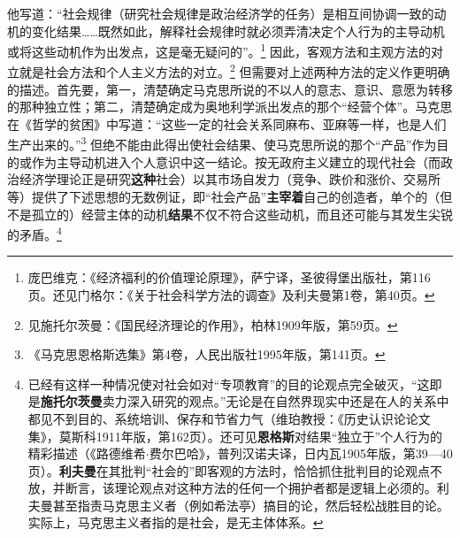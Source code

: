 \documentclass[fontset=fandol, a4paper, 12pt, openright]{ctexbook}
\begin{document}
他写道：“社会规律（研究社会规律是政治经济学的任务）是相互间协调一致的动机的变化结果……既然如此，解释社会规律时就必须弄清决定个人行为的主导动机或将这些动机作为出发点，这是毫无疑问的”。\footnote{庞巴维克：《经济福利的价值理论原理》，萨宁译，圣彼得堡出版社，第116页。还见门格尔：《关于社会科学方法的调查》及利夫曼第1卷，第40页。} 因此，客观方法和主观方法的对立就是社会方法和个人主义方法的对立。\footnote{见施托尔茨曼：《国民经济理论的作用》，柏林1909年版，第59页。} 但需要对上述两种方法的定义作更明确的描述。首先要，第一，清楚确定马克思所说的不以人的意志、意识、意愿为转移的那种独立性；第二，清楚确定成为奥地利学派出发点的那个“经营个体”。马克思在《哲学的贫困》中写道：“这些一定的社会关系同麻布、亚麻等一样，也是人们生产出来的。”\footnote{《马克思恩格斯选集》第4卷，人民出版社1995年版，第141页。} 但绝不能由此得出使社会结果、使马克思所说的那个“产品”作为目的或作为主导动机进入个人意识中这一结论。按无政府主义建立的现代社会（而政治经济学理论正是研究\textbf{这种}社会）以其市场自发力（竞争、跌价和涨价、交易所等）提供了下述思想的无数例证，即“社会产品”\textbf{主宰着}自己的创造者，单个的（但不是孤立的）经营主体的动机\textbf{结果}不仅不符合这些动机，而且还可能与其发生尖锐的矛盾。\footnote{已经有这样一种情况使对社会如对“专项教育”的目的论观点完全破灭，“这即是\textbf{施托尔茨曼}卖力深入研究的观点。”无论是在自然界现实中还是在人的关系中都见不到目的、系统培训、保存和节省力气（维珀教授：《历史认识论论文集》，莫斯科1911年版，第162页）。还可见\textbf{恩格斯}对结果“独立于”个人行为的精彩描述（《路德维希$\cdot$费尔巴哈》，普列汉诺夫译，日内瓦1905年版，第39—40页）。\textbf{利夫曼}在其批判“社会的”即客观的方法时，恰恰抓住批判目的论观点不放，并断言，该理论观点对这种方法的任何一个拥护者都是逻辑上必须的。利夫曼甚至指责马克思主义者（例如希法亭）搞目的论，然后轻松战胜目的论。实际上，马克思主义者指的是社会，是无主体体系。} 
\end{document}
